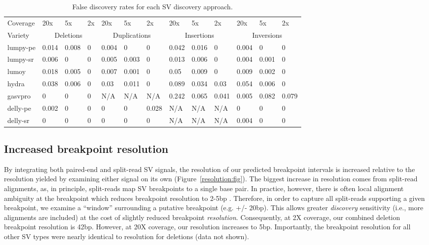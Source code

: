 \documentclass[11pt]{article}
\begin{document}
\begin{table}[h!b!p!]
\small
\caption{False discovery rates for each SV discovery approach.}
\begin{tabular}{l|lll|lll|lll|lll}
		Coverage
		&20x&5x&2x &20x&5x&2x &20x&5x&2x &20x&5x&2x \\
\cline{1-13}
			Variety
			&\multicolumn{3}{c}{Deletions} 
			&\multicolumn{3}{|c}{Duplications} 
			&\multicolumn{3}{|c}{Insertions}
			&\multicolumn{3}{|c}{Inversions} \\
\cline{1-13}
lumpy-pe		&0.014&0.008&0&0.004&0	  &0    &0.042&0.016&0	  &0.004&0	  &0 \\
lumpy-sr      &0.006&0	&0&0.005&0.003&0	&0.013&0.006&0	  &0.004&0.001&0 \\
lumoy    &0.018&0.005&0&0.007&0.001&0	&0.05 &0.009&0	  &0.009&0.002&0 \\
hydra   &0.038&0.006&0&0.03 &0.011&0	&0.089&0.034&0.03 &0.054&0.006&0 \\
gasvpro	&0	  &0	&0&N/A  &N/A  &N/A  &0.242&0.065&0.041&0.005&0.082&0.079 \\
delly-pe	&0.002&0	&0&0	&0	  &0.028&N/A  &N/A	&N/A  &0	&0	  &0 \\
delly-sr	&0	  &0	&0&0	&0	  &0	&N/A  &N/A	&N/A  &0.004&0	  &0 \\ 

\end{tabular}
\label{table:fdr}
\end{table}


\subsection{Increased breakpoint resolution}
By integrating both paired-end and split-read SV signals, the resolution of
our predicted breakpoint intervals is increased relative to the resolution 
yielded by examining either signal on its own (Figure~\ref{resolution:fig}). 
The biggest increase in resolution comes from split-read alignments, as, 
in principle, split-reads
map SV breakpoints to a single base pair. In practice, however, there is
often local alignment ambiguity at the breakpoint which reduces breakpoint 
resolution to 2-5bp \cite{quinlan2010b}. Therefore, in order to capture all
split-reads supporting a given breakpoint, we examine a ``window'' surrounding
a putative breakpoint (e.g. +/- 20bp). This allows greater \emph{discovery}
sensitivity (i.e., more alignments are included) at the cost of slightly reduced
breakpoint \emph{resolution}. Consequently, at 2X coverage, our combined
deletion breakpoint resolution is 42bp. However, at 20X coverage, our resolution
increases to 5bp. Importantly, the breakpoint resolution for all other SV types 
were nearly identical to resolution for deletions (data not shown).
\end{document}

